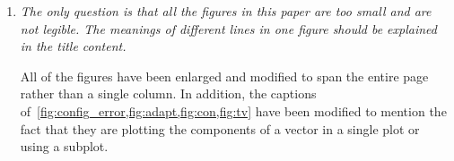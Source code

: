 \documentclass[11pt]{article}
\begin{document}
\begin{enumerate}
\item \textit{The only question is that all the figures in this paper are too small and are not legible. The meanings of different lines in one figure should be explained in the title content.}

All of the figures have been enlarged and modified to span the entire page rather than a single column. 
In addition, the captions of~\cref{fig:config_error,fig:adapt,fig:con,fig:tv} have been modified to mention the fact that they are plotting the components of a vector in a single plot or using a subplot.
\end{enumerate}



\end{document}
